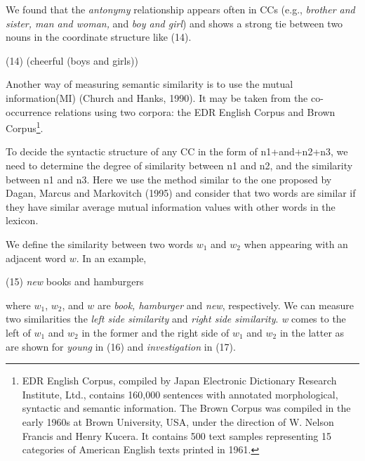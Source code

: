 \vspace*{5mm}

We found that the {\it antonymy} relationship appears often in CCs 
(e.g., {\it brother and sister, man and woman,} and {\it boy and girl}) and
shows a strong tie between two nouns in the coordinate structure like (14). 

 \vspace*{4mm}

 \hspace*{5mm}(14) (cheerful (boys and girls))

 \vspace*{4mm}
Another way of measuring semantic  similarity is to use the  mutual
information(MI) (Church and Hanks, 1990). It may be taken from the co-occurrence
relations using two corpora: the EDR English Corpus and Brown
Corpus\footnote{EDR English Corpus, compiled by Japan Electronic Dictionary Research
Institute, Ltd., contains 160,000 sentences with annotated morphological, 
syntactic and semantic information. The Brown Corpus was compiled in the
early 1960s at Brown University, USA, under the direction of W. Nelson
Francis and Henry Kucera. It contains 500 text samples representing 15 categories 
of American English texts printed in 1961.}. 

To decide the syntactic structure of any CC in the form of n1+and+n2+n3, we need to
determine the degree of similarity between n1 and n2, and the similarity between n1 and n3.
Here we use the method similar to the one proposed by Dagan, Marcus and 
Markovitch (1995) and consider that two words are similar if they have similar average 
mutual information values with other words in the lexicon.

We define the similarity between two words $w_1$ and $w_2$ when appearing with an
adjacent word $w$. In an example,

\vspace*{4mm}

\hspace*{5mm}(15) {\it new} books and hamburgers

\vspace*{4mm}
\hspace*{-5mm}where  $w_1$, $w_2$, and $w$ are {\it book, hamburger} and
{\it new}, respectively.  We can measure two similarities the
{\it left side similarity} and {\it right side similarity}. {\it w} comes to
the left of $w_1$ and $w_2$ in the former  and
the right side of $w_1$ and $w_2$ in the latter as are shown for {\it young}
in (16) and {\it investigation} in (17).

